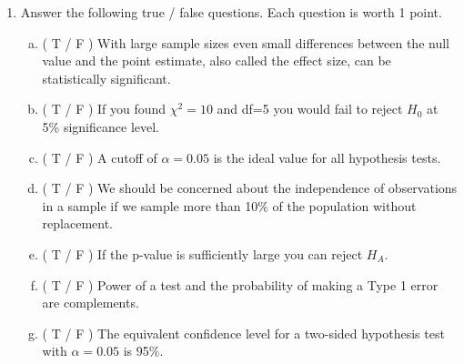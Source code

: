 \documentclass[11pt]{article}
\newcommand{\solnMult}[1]{ #1 }
\begin{document}
\begin{enumerate}
%

\vspace{2cm}

\item Answer the following true / false questions. Each question is worth 1 point.
\begin{enumerate}[(a)]
\vspace{3mm} \item ( \solnMult{T} / F ) With large sample sizes even small differences between the null value and the 
point estimate, also called the effect size, can be statistically significant.
\vspace{3mm} \item ( \solnMult{T} / F ) If you found $\chi^2=10$ and df=5 you would fail to reject $H_0$ at 5\% significance level.
\vspace{3mm} \item ( T / \solnMult{F} ) A cutoff of $\alpha = 0.05$ is the ideal value for all hypothesis tests.
\vspace{3mm} \item ( \solnMult{T} / F ) We should be concerned about the independence of observations in a sample 
if we sample more than 10\% of the population without replacement.
\vspace{3mm} \item ( T / \solnMult{F} ) If the p-value is sufficiently large you can reject $H_A$.
\vspace{3mm} \item ( T / \solnMult{F} ) Power of a test and the probability of making a Type 1 error are complements.
\vspace{3mm} \item ( \solnMult{T} / F ) The equivalent confidence level for a two-sided hypothesis test with $\alpha = 0.05$ is 95\%.
\vspace{10mm}
\end{enumerate}

\end{enumerate}
%
%
\end{document}
